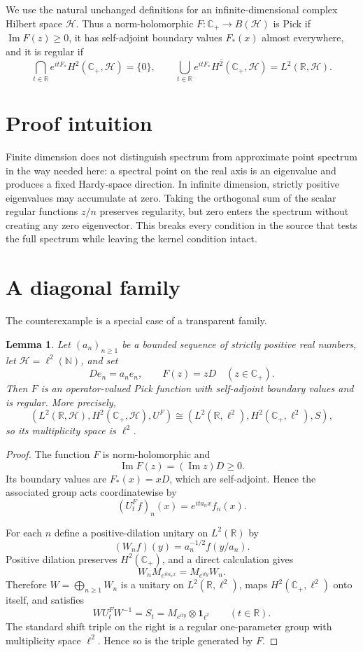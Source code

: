 \documentclass[11pt]{article}
\newtheorem{lemma}[theorem]{Lemma}
\newcommand{\Cplus}{\mathbb C_+}
\begin{document}
We use the natural unchanged definitions for an infinite-dimensional complex
Hilbert space $\mathcal H$.  Thus a norm-holomorphic
$F:\Cplus\to B(\mathcal H)$ is Pick if $\operatorname{Im}F(z)\geq0$, it has
self-adjoint boundary values $F_*(x)$ almost everywhere, and it is regular if
\[
 \bigcap_{t\in\mathbb R}e^{itF_*}H^2(\Cplus,\mathcal H)=\{0\},
 \qquad
 \overline{\bigcup_{t\in\mathbb R}e^{itF_*}
 H^2(\Cplus,\mathcal H)}=L^2(\mathbb R,\mathcal H).
\]

\section{Proof intuition}

Finite dimension does not distinguish spectrum from approximate point
spectrum in the way needed here: a spectral point on the real axis is an
eigenvalue and produces a fixed Hardy-space direction.  In infinite
dimension, strictly positive eigenvalues may accumulate at zero.  Taking the
orthogonal sum of the scalar regular functions $z/n$ preserves regularity,
but zero enters the spectrum without creating any zero eigenvector.  This
breaks every condition in the source that tests the full spectrum while
leaving the kernel condition intact.

\section{A diagonal family}

The counterexample is a special case of a transparent family.

\begin{lemma}\label{lem:family}
Let $(a_n)_{n\geq1}$ be a bounded sequence of strictly positive real numbers,
let $\mathcal H=\ell^2(\mathbb N)$, and set
\[
 De_n=a_ne_n,\qquad F(z)=zD\quad(z\in\Cplus).
\]
Then $F$ is an operator-valued Pick function with self-adjoint boundary
values and is regular.  More precisely,
\[
 (L^2(\mathbb R,\mathcal H),H^2(\Cplus,\mathcal H),U^F)
 \cong
 (L^2(\mathbb R,\ell^2),H^2(\Cplus,\ell^2),S),
\]
so its multiplicity space is $\ell^2$.
\end{lemma}

\begin{proof}
The function $F$ is norm-holomorphic and
\[
 \operatorname{Im}F(z)=(\operatorname{Im}z)D\geq0.
\]
Its boundary values are $F_*(x)=xD$, which are self-adjoint.  Hence the
associated group acts coordinatewise by
\[
 (U_t^Ff)_n(x)=e^{ita_nx}f_n(x).
\]

For each $n$ define a positive-dilation unitary on $L^2(\mathbb R)$ by
\[
 (W_nf)(y)=a_n^{-1/2}f(y/a_n).
\]
Positive dilation preserves $H^2(\Cplus)$, and a direct calculation gives
\[
 W_nM_{e^{ita_nx}}=M_{e^{ity}}W_n.
\]
Therefore $W=\bigoplus_{n\geq1}W_n$ is a unitary on
$L^2(\mathbb R,\ell^2)$, maps $H^2(\Cplus,\ell^2)$ onto itself, and satisfies
\[
 WU_t^FW^{-1}=S_t=M_{e^{ity}}\otimes\mathbf 1_{\ell^2}
 \qquad(t\in\mathbb R).
\]
The standard shift triple on the right is a regular one-parameter group with
multiplicity space $\ell^2$.  Hence so is the triple generated by $F$.
\end{proof}
\end{document}
